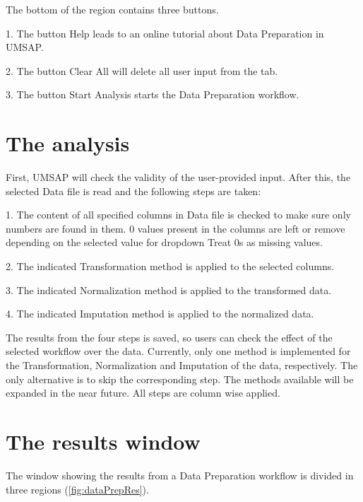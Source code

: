 The bottom of the region contains three buttons.

\num{1}. The button Help leads to an online tutorial about Data Preparation in
UMSAP.

\num{2}. The button Clear All will delete all user input from the tab.

\num{3}. The button Start Analysis starts the Data Preparation workflow.

\section{The analysis}

First, UMSAP will check the validity of the user-provided input. After this, the
selected Data file is read and the following steps are taken:

\num{1}. The content of all specified columns in Data file is checked to make sure
only numbers are found in them. \num{0} values present in the columns are left or
remove depending on the selected value for dropdown Treat \num{0}s as missing values.

\num{2}. The indicated Transformation method is applied to the selected columns.

\num{3}. The indicated Normalization method is applied to the transformed data.

\num{4}. The indicated Imputation method is applied to the normalized data.

The results from the four steps is saved, so users can check the effect of the selected
workflow over the data. Currently, only one method is implemented for the Transformation,
Normalization and Imputation of the data, respectively. The only alternative is to skip
the corresponding step. The methods available will be expanded in the near future.
All steps are column wise applied.

\section{The results window}

The window showing the results from a Data Preparation workflow is divided in three
regions (\autoref{fig:dataPrepRes}).

